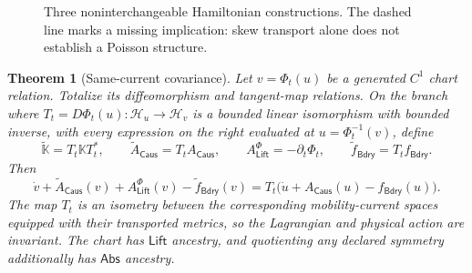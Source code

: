 \documentclass[11pt]{article}
\numberwithin{section}{part}
\theoremstyle{plain}
\newtheorem{theorem}{Theorem}[section]
\theoremstyle{definition}
\theoremstyle{remark}
\newcommand{\Caus}{\mathsf{Caus}}
\newcommand{\Abs}{\mathsf{Abs}}
\newcommand{\Lift}{\mathsf{Lift}}
\newcommand{\Bdry}{\mathsf{Bdry}}
\newcommand{\Hspace}{\mathcal H}
\begin{document}
\begin{figure}[tbp]
\centering
{}
\caption{Three noninterchangeable Hamiltonian constructions.  The dashed
line marks a missing implication: skew transport alone does not establish a
Poisson structure.}
\label{fig:three-hamiltonian-meanings}
\end{figure}

\begin{theorem}[Same-current covariance]
\label{thm:same-current-covariance}
Let \(v=\Phi_t(u)\) be a generated \(C^1\) chart relation.  Totalize its
diffeomorphism and tangent-map relations.  On the branch where
\(T_t=D\Phi_t(u):\Hspace_u\to\Hspace_v\) is a bounded linear isomorphism
with bounded inverse, with every expression on the right evaluated at
\(u=\Phi_t^{-1}(v)\), define
\begin{equation}
 \label{eq:transported-covariant-data}
 \widetilde{\mathbb K}=T_t\mathbb KT_t^*,
 \qquad
 \widetilde A_{\Caus}=T_tA_{\Caus},
 \qquad
 A_{\Lift}^{\Phi}=-\partial_t\Phi_t,
 \qquad
 \widetilde f_{\Bdry}=T_tf_{\Bdry}.
\end{equation}
Then
\begin{equation}
 \label{eq:same-current-covariance}
 \dot v+\widetilde A_{\Caus}(v)+A_{\Lift}^{\Phi}(v)
       -\widetilde f_{\Bdry}(v)
 =T_t\bigl(\dot u+A_{\Caus}(u)-f_{\Bdry}(u)\bigr).
\end{equation}
The map \(T_t\) is an isometry between the corresponding mobility-current
spaces equipped with their transported metrics, so the Lagrangian and
physical action are invariant.  The chart has
\(\Lift\) ancestry, and quotienting any declared symmetry additionally has
\(\Abs\) ancestry.
\end{theorem}
\end{document}
